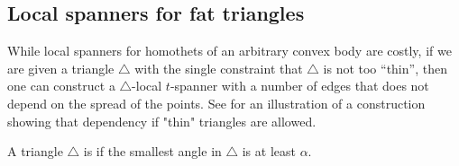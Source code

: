 
\subsection{Local spanners for fat triangles}


While local spanners for homothets of an arbitrary convex body are
costly, if we are given a triangle $\triangle$ with the single
constraint that $\triangle$ is not too ``thin'', then one can
construct a $\triangle$-local $t$-spanner with a number of edges that
does not depend on the spread of the points. See 
for an illustration of a construction showing that dependency if
"thin" triangles are allowed.



\begin{defn}
    A triangle $\triangle$ is  if the smallest
    angle in $\triangle$ is at least $\alpha$.
\end{defn}


